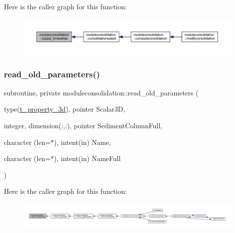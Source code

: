 Here is the caller graph for this function\+:\nopagebreak
\begin{figure}[H]
\begin{center}
\leavevmode
\includegraphics[width=350pt]{namespacemoduleconsolidation_aaca2f5ea993ad6f34b1699f8fccfe168_icgraph}
\end{center}
\end{figure}
\mbox{\label{namespacemoduleconsolidation_ad228e075c84afa273170a1c50c1a9f41}} 
\subsubsection{\texorpdfstring{read\+\_\+old\+\_\+parameters()}{read\_old\_parameters()}}
{\footnotesize\ttfamily subroutine, private moduleconsolidation\+::read\+\_\+old\+\_\+parameters (\begin{DoxyParamCaption}\item[{type(\mbox{\hyperlink{structmoduleconsolidation_1_1t__property__3d}{t\+\_\+property\+\_\+3d}}), pointer}]{Scalar3D,  }\item[{integer, dimension(\+:,\+:), pointer}]{Sediment\+Column\+Full,  }\item[{character (len=$\ast$), intent(in)}]{Name,  }\item[{character (len=$\ast$), intent(in)}]{Name\+Full }\end{DoxyParamCaption})\hspace{0.3cm}{\ttfamily [private]}}

Here is the caller graph for this function\+:\nopagebreak
\begin{figure}[H]
\begin{center}
\leavevmode
\includegraphics[width=350pt]{namespacemoduleconsolidation_ad228e075c84afa273170a1c50c1a9f41_icgraph}
\end{center}
\end{figure}
\mbox{\label{namespacemoduleconsolidation_adc874bdb2826879904126cec4cd75459}} 
